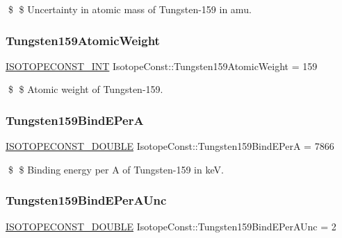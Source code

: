\$ \$ Uncertainty in atomic mass of Tungsten-\/159 in amu. \mbox{\label{group___isotope_const-_tungsten-_w159_ga790ac3d99991fe0f4ff22d29262e3fb8}} 
\subsubsection{\texorpdfstring{Tungsten159\+Atomic\+Weight}{Tungsten159AtomicWeight}}
{\footnotesize\ttfamily \mbox{\hyperlink{group___isotope_const-_macros_ga5f18360b3e99483a35c32d789e62621c}{I\+S\+O\+T\+O\+P\+E\+C\+O\+N\+S\+T\+\_\+\+I\+NT}} Isotope\+Const\+::\+Tungsten159\+Atomic\+Weight = 159}

\$ \$ Atomic weight of Tungsten-\/159. \mbox{\label{group___isotope_const-_tungsten-_w159_gab6c789cc83c6f4bfc6faada9e46965d3}} 
\subsubsection{\texorpdfstring{Tungsten159\+Bind\+E\+PerA}{Tungsten159BindEPerA}}
{\footnotesize\ttfamily \mbox{\hyperlink{group___isotope_const-_macros_ga8f45a7272ce02c0b4c65c44636ed719a}{I\+S\+O\+T\+O\+P\+E\+C\+O\+N\+S\+T\+\_\+\+D\+O\+U\+B\+LE}} Isotope\+Const\+::\+Tungsten159\+Bind\+E\+PerA = 7866}

\$ \$ Binding energy per A of Tungsten-\/159 in keV. \mbox{\label{group___isotope_const-_tungsten-_w159_ga7edd5a49e84343f390f99a7f1066f2c2}} 
\subsubsection{\texorpdfstring{Tungsten159\+Bind\+E\+Per\+A\+Unc}{Tungsten159BindEPerAUnc}}
{\footnotesize\ttfamily \mbox{\hyperlink{group___isotope_const-_macros_ga8f45a7272ce02c0b4c65c44636ed719a}{I\+S\+O\+T\+O\+P\+E\+C\+O\+N\+S\+T\+\_\+\+D\+O\+U\+B\+LE}} Isotope\+Const\+::\+Tungsten159\+Bind\+E\+Per\+A\+Unc = 2}

